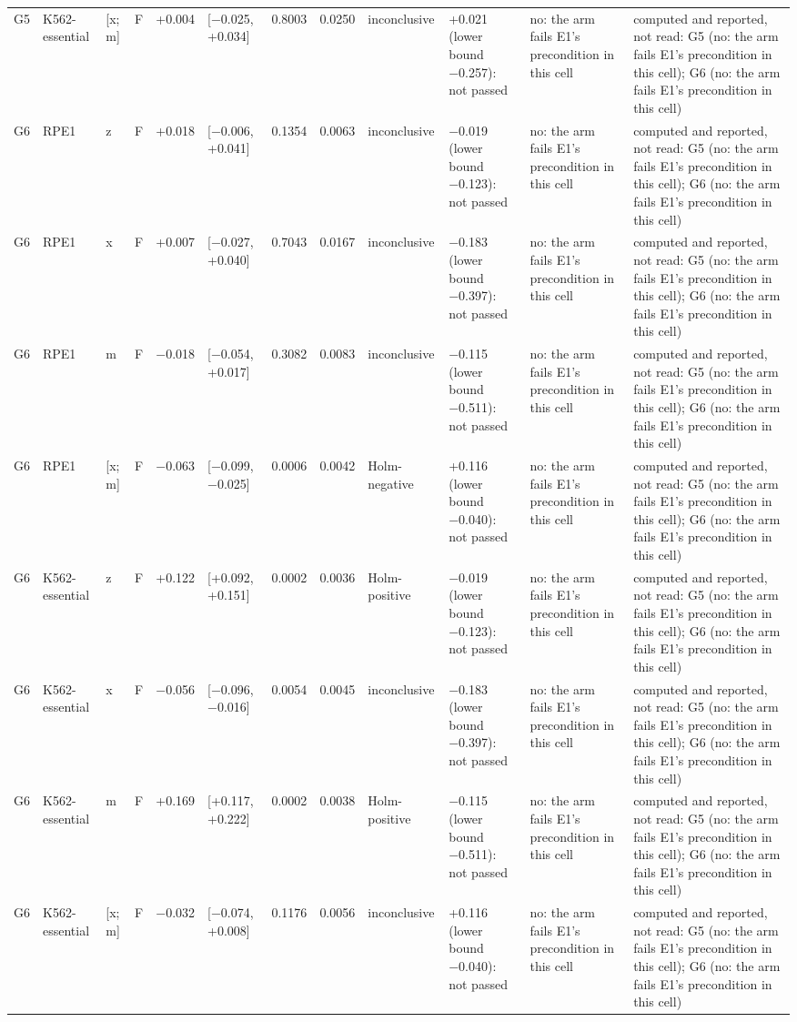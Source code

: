\begin{tabular}{llllrlrrllll}
G5 & K562-essential & [x; m] & F & +0.004 & [−0.025, +0.034] & 0.8003 & 0.0250 & inconclusive & +0.021 (lower bound −0.257): not passed & no: the arm fails E1's precondition in this cell & computed and reported, not read: G5 (no: the arm fails E1's precondition in this cell); G6 (no: the arm fails E1's precondition in this cell) \\
G6 & RPE1 & z & F & +0.018 & [−0.006, +0.041] & 0.1354 & 0.0063 & inconclusive & −0.019 (lower bound −0.123): not passed & no: the arm fails E1's precondition in this cell & computed and reported, not read: G5 (no: the arm fails E1's precondition in this cell); G6 (no: the arm fails E1's precondition in this cell) \\
G6 & RPE1 & x & F & +0.007 & [−0.027, +0.040] & 0.7043 & 0.0167 & inconclusive & −0.183 (lower bound −0.397): not passed & no: the arm fails E1's precondition in this cell & computed and reported, not read: G5 (no: the arm fails E1's precondition in this cell); G6 (no: the arm fails E1's precondition in this cell) \\
G6 & RPE1 & m & F & −0.018 & [−0.054, +0.017] & 0.3082 & 0.0083 & inconclusive & −0.115 (lower bound −0.511): not passed & no: the arm fails E1's precondition in this cell & computed and reported, not read: G5 (no: the arm fails E1's precondition in this cell); G6 (no: the arm fails E1's precondition in this cell) \\
G6 & RPE1 & [x; m] & F & −0.063 & [−0.099, −0.025] & 0.0006 & 0.0042 & Holm-negative & +0.116 (lower bound −0.040): not passed & no: the arm fails E1's precondition in this cell & computed and reported, not read: G5 (no: the arm fails E1's precondition in this cell); G6 (no: the arm fails E1's precondition in this cell) \\
G6 & K562-essential & z & F & +0.122 & [+0.092, +0.151] & 0.0002 & 0.0036 & Holm-positive & −0.019 (lower bound −0.123): not passed & no: the arm fails E1's precondition in this cell & computed and reported, not read: G5 (no: the arm fails E1's precondition in this cell); G6 (no: the arm fails E1's precondition in this cell) \\
G6 & K562-essential & x & F & −0.056 & [−0.096, −0.016] & 0.0054 & 0.0045 & inconclusive & −0.183 (lower bound −0.397): not passed & no: the arm fails E1's precondition in this cell & computed and reported, not read: G5 (no: the arm fails E1's precondition in this cell); G6 (no: the arm fails E1's precondition in this cell) \\
G6 & K562-essential & m & F & +0.169 & [+0.117, +0.222] & 0.0002 & 0.0038 & Holm-positive & −0.115 (lower bound −0.511): not passed & no: the arm fails E1's precondition in this cell & computed and reported, not read: G5 (no: the arm fails E1's precondition in this cell); G6 (no: the arm fails E1's precondition in this cell) \\
G6 & K562-essential & [x; m] & F & −0.032 & [−0.074, +0.008] & 0.1176 & 0.0056 & inconclusive & +0.116 (lower bound −0.040): not passed & no: the arm fails E1's precondition in this cell & computed and reported, not read: G5 (no: the arm fails E1's precondition in this cell); G6 (no: the arm fails E1's precondition in this cell) \\
\bottomrule
\end{tabular}
